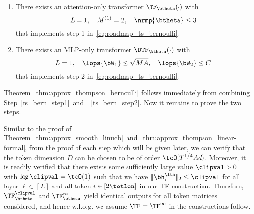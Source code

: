 \begin{enumerate}[label=Step \arabic*,ref= \arabic*]
    \item\label{ts_bern_step1} There exists an attention-only transformer $\TF_\btheta(\cdot)$ with     $$L=1,~~~M^{(1)}=2,~~~ \nrmp{\btheta}\leq 3 $$
 that implements step 1 in~\eqref{eq:roadmap_ts_bernoulli}.
   \item\label{ts_bern_step2} There exists an  MLP-only transformer $\DTF_\btheta(\cdot)$ with 
    $$L=1,~~~\lops{\bW_1}\leq \sqrt{MA}, ~~~\lops{\bW_2}\leq C$$
 that implements step 2 in~\eqref{eq:roadmap_ts_bernoulli}.
\end{enumerate}
Theorem~\ref{thm:approx_thompson_bernoulli} follows immediately from combining Step~\ref{ts_bern_step1}~and~~\ref{ts_bern_step2}.  Now it remains to prove the two steps.


 Similar to the proof of Theorem~\ref{thm:approx_smooth_linucb}~and~\ref{thm:approx_thompson_linear-formal}, from the proof of each step which will be given later, we can verify that the token dimension $D$ can be chosen to be of order $\tcO(T^{1/4}Ad)$. Moreover,  it is readily verified that there exists some sufficiently large value $\clipval>0$ with $\log \clipval=\tcO(1)$ such that  we have $\| \bh_i^{\lth} \|_{2} \leq\clipval$
 for all layer $\ell\in[L]$ and all token $i\in[2\totlen]$ in our TF construction. Therefore, $\TF^\clipval_\btheta$ and $\TF^\infty_\btheta$ yield identical outputs for all token matrices considered, and hence w.l.o.g. we assume $\TF=\TF^\infty$ in the constructions follow.










